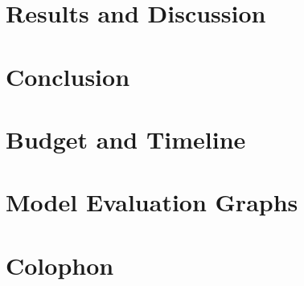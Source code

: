 \chapter{Results and Discussion}
	\Mprintcontents
	\label{ch:results}
	
	\stopcontents[chapters]
	\clearpage
	
\chapter{Conclusion}
	\Mprintcontents
	\label{ch:conclusion}
	
	\stopcontents[chapters]
	\clearpage


\printbibliography

\clearpage

\appendix
\chapter{Budget and Timeline}
	\label{app:budget-timeline}
	
	
\chapter{Model Evaluation Graphs}
	\label{app:model-evaluation-graphs}
	

\backmatter
\chapter{Colophon}
	



